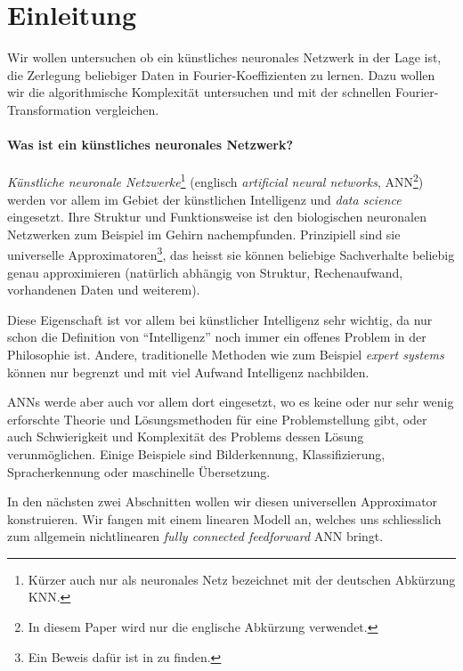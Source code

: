 %
%
%
%
\section{Einleitung\label{ml:einleitung}}

Wir wollen untersuchen ob ein künstliches neuronales Netzwerk in der Lage ist, die Zerlegung beliebiger
Daten in Fourier-Koeffizienten zu lernen. Dazu wollen wir die algorithmische
Komplexität untersuchen und mit der schnellen Fourier-Transformation vergleichen.

\paragraph{Was ist ein künstliches neuronales Netzwerk?} \emph{Künstliche neuronale
Netzwerke}\footnote{Kürzer auch nur als neuronales Netz bezeichnet mit der deutschen
Abkürzung KNN.} (englisch \emph{artificial neural networks}, ANN\footnote{In diesem Paper
wird nur die englische Abkürzung verwendet.}) werden vor allem im Gebiet der künstlichen
Intelligenz und \emph{data science} eingesetzt. Ihre Struktur und Funktionsweise ist den
biologischen neuronalen Netzwerken zum Beispiel im Gehirn nachempfunden. Prinzipiell sind
sie universelle Approximatoren\footnote{Ein Beweis dafür ist in
\cite{ml:universala-approximator-theorem} zu finden.}, das heisst sie können beliebige
Sachverhalte beliebig genau approximieren (natürlich abhängig von Struktur, Rechenaufwand,
vorhandenen Daten und weiterem).

Diese Eigenschaft ist vor allem bei künstlicher Intelligenz sehr wichtig,
da nur schon die Definition von ``Intelligenz'' noch immer ein offenes Problem in der
Philosophie ist. Andere, traditionelle Methoden wie zum Beispiel \emph{expert systems} können
nur begrenzt und mit viel Aufwand Intelligenz nachbilden.

ANNs werde aber auch vor allem dort eingesetzt, wo es keine oder nur sehr wenig erforschte
Theorie und Lösungsmethoden für eine Problemstellung gibt, oder auch Schwierigkeit und
Komplexität des Problems dessen Lösung verunmöglichen. Einige Beispiele sind
Bilderkennung, Klassifizierung, Spracherkennung oder maschinelle Übersetzung.

\medskip
In den nächsten zwei Abschnitten wollen wir diesen universellen Approximator konstruieren.
Wir fangen mit einem linearen Modell an, welches uns schliesslich zum allgemein
nichtlinearen \emph{fully connected feedforward} ANN bringt.
